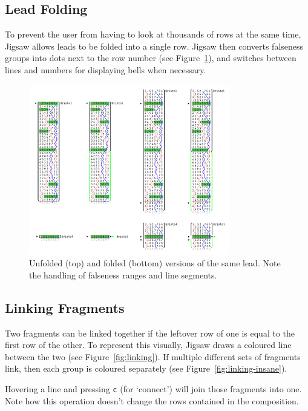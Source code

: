 \documentclass[12pt]{article}
\begin{document}
\subsection{Lead Folding}

To prevent the user from having to look at thousands of rows at the same time, Jigsaw allows leads
to be folded into a single row.  Jigsaw then converts falseness groups into dots next to the row
number (see Figure~\ref{fig:lead-folding}), and switches between lines and numbers for displaying
bells when necessary.

\begin{figure}
    \centering
    \includegraphics[width=0.78\textwidth]{folding-full}
    \caption{Unfolded (top) and folded (bottom) versions of the same lead.  Note the handling of
    falseness ranges and line segments.}\label{fig:lead-folding}
\end{figure}

\subsection{Linking Fragments}

Two fragments can be linked together if the leftover row of one is equal to the first row of the
other.  To represent this visually, Jigsaw draws a coloured line between the two (see
Figure~\ref{fig:linking}).  If multiple different sets of fragments link, then each group is
coloured separately (see Figure~\ref{fig:linking-insane}).

Hovering a line and pressing \verb|c| (for `connect') will join those fragments into one.  Note how
this operation doesn't change the rows contained in the composition.
\end{document}
